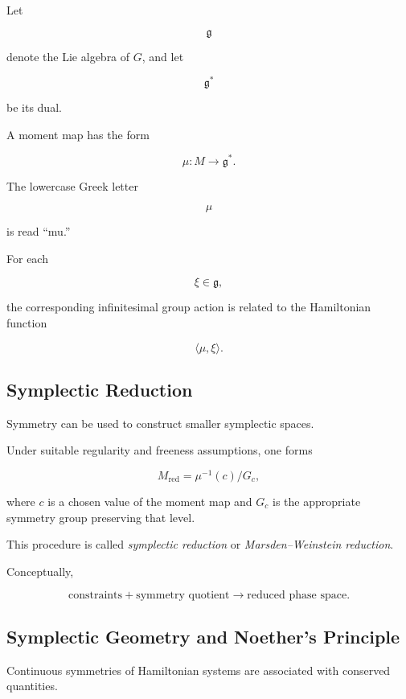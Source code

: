 Let

\[
\mathfrak g
\]

denote the Lie algebra of \(G\), and let

\[
\mathfrak g^*
\]

be its dual.

A moment map has the form

\[
\boxed{
\mu:M\to\mathfrak g^*.
}
\]

The lowercase Greek letter

\[
\mu
\]

is read ``mu.''

For each

\[
\xi\in\mathfrak g,
\]

the corresponding infinitesimal group action is related to the Hamiltonian
function

\[
\langle\mu,\xi\rangle.
\]

\subsection{Symplectic Reduction}
\label{subsec:symplectic-reduction}

Symmetry can be used to construct smaller symplectic spaces.

Under suitable regularity and freeness assumptions, one forms

\[
\boxed{
M_{\mathrm{red}}
=
\mu^{-1}(c)/G_c,
}
\]

where \(c\) is a chosen value of the moment map and \(G_c\) is the
appropriate symmetry group preserving that level.

This procedure is called \emph{symplectic reduction} or
\emph{Marsden--Weinstein reduction}.

Conceptually,

\[
\boxed{
\text{constraints}
+
\text{symmetry quotient}
\longrightarrow
\text{reduced phase space}.
}
\]

\subsection{Symplectic Geometry and Noether's Principle}
\label{subsec:symplectic-noether}

Continuous symmetries of Hamiltonian systems are associated with conserved
quantities.

